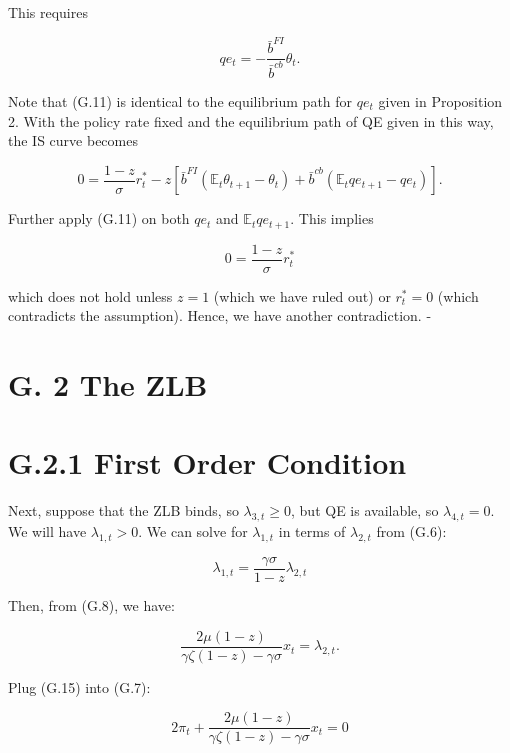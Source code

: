 \documentclass[10pt]{article}
\begin{document}
This requires

\begin{equation*}
q e_{t}=-\frac{\bar{b}^{F I}}{\bar{b}^{c b}} \theta_{t} . \tag{G.11}
\end{equation*}

Note that (G.11) is identical to the equilibrium path for $q e_{t}$ given in Proposition 2. With the policy rate fixed and the equilibrium path of QE given in this way, the IS curve becomes

\begin{equation*}
0=\frac{1-z}{\sigma} r_{t}^{*}-z\left[\bar{b}^{F I}\left(\mathbb{E}_{t} \theta_{t+1}-\theta_{t}\right)+\bar{b}^{c b}\left(\mathbb{E}_{t} q e_{t+1}-q e_{t}\right)\right] . \tag{G.12}
\end{equation*}

Further apply (G.11) on both $q e_{t}$ and $\mathbb{E}_{t} q e_{t+1}$. This implies

\begin{equation*}
0=\frac{1-z}{\sigma} r_{t}^{*} \tag{G.13}
\end{equation*}

which does not hold unless $z=1$ (which we have ruled out) or $r_{t}^{*}=0$ (which contradicts the assumption). Hence, we have another contradiction. -

\section*{G. 2 The ZLB}
\section*{G.2.1 First Order Condition}
Next, suppose that the ZLB binds, so $\lambda_{3, t} \geq 0$, but QE is available, so $\lambda_{4, t}=0$. We will have $\lambda_{1, t}>0$. We can solve for $\lambda_{1, t}$ in terms of $\lambda_{2, t}$ from (G.6):

\begin{equation*}
\lambda_{1, t}=\frac{\gamma \sigma}{1-z} \lambda_{2, t} \tag{G.14}
\end{equation*}

Then, from (G.8), we have:

\begin{equation*}
\frac{2 \mu(1-z)}{\gamma \zeta(1-z)-\gamma \sigma} x_{t}=\lambda_{2, t} . \tag{G.15}
\end{equation*}

Plug (G.15) into (G.7):

\begin{equation*}
2 \pi_{t}+\frac{2 \mu(1-z)}{\gamma \zeta(1-z)-\gamma \sigma} x_{t}=0
\end{equation*}
\end{document}
